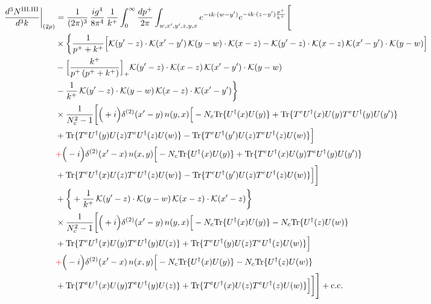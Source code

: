 \documentclass[9pt]{article}
\numberwithin{equation}{section}
\begin{document}
\begin{align}
\frac{d^{3}N^{\rm III.III}}{d^{3}k}\bigg|_{(2\rho)}&=\frac{1}{(2\pi)^{3}}\,\frac{ig^{4}}{8\pi^{4}}\,\frac{1}{k^{+}}\int_{0}^{\infty}\frac{dp^{+}}{2\pi}\int_{w,x',y',z,y,x}e^{-ik\cdot(w-y')}e^{-ik\cdot(z-y')\frac{p^{+}}{k^{+}}}\Bigg[\notag\\
&\times\bigg\{\frac{1}{p^{+}+k^{+}}\Big[\mathcal{K}(y'-z)\cdot\mathcal{K}(x'-y')\,\mathcal{K}(y-w)\cdot\mathcal{K}(x-z)-\mathcal{K}(y'-z)\cdot\mathcal{K}(x-z)\,\mathcal{K}(x'-y')\cdot\mathcal{K}(y-w)\Big]\notag\\
&-\Big[\frac{k^{+}}{p^{+}\,(p^{+}+k^{+})}\Big]_{+}\mathcal{K}(y'-z)\cdot\mathcal{K}(x-z)\,\mathcal{K}(x'-y')\cdot\mathcal{K}(y-w)\notag\\
&-\frac{1}{k^{+}}\,\mathcal{K}(y'-z)\cdot\mathcal{K}(y-w)\,\mathcal{K}(x-z)\cdot\mathcal{K}(x'-y')\bigg\}\notag\\
&\times \frac{1}{N_{c}^{2}-1}\bigg[\Big(+i\Big)\delta^{(2)}(x'-y)\,n(y,x)\Big[-N_{c}{\rm Tr}\{U^{\dagger}(x)U(y)\}+{\rm Tr}\{T^{e}U^{\dagger}(x)U(y)T^{e}U^{\dagger}(y)U(y')\}\notag\\
& +{\rm Tr}\{T^{e}U^{\dagger}(y)U(z)T^{e}U^{\dagger}(z)U(w)\}-{\rm Tr}\{T^{e}U^{\dagger}(y')U(z)T^{e}U^{\dagger}(z)U(w)\}\Big]\notag\\
& {\color{red}+}\Big(-i\Big)\delta^{(2)}(x'-x)\,n(x,y)\Big[-N_{c}{\rm Tr}\{U^{\dagger}(x)U(y)\}+{\rm Tr}\{T^{e}U^{\dagger}(x)U(y)T^{e}U^{\dagger}(y)U(y')\}\notag\\
& +{\rm Tr}\{T^{e}U^{\dagger}(x)U(z)T^{e}U^{\dagger}(z)U(w)\}-{\rm Tr}\{T^{e}U^{\dagger}(y')U(z)T^{e}U^{\dagger}(z)U(w)\}\Big]\bigg]\notag\\
&+\bigg\{+\frac{1}{k^{+}}\,\mathcal{K}(y'-z)\cdot\mathcal{K}(y-w)\,\mathcal{K}(x-z)\cdot\mathcal{K}(x'-z)\bigg\}\notag\\
&\times \frac{1}{N_{c}^{2}-1}\bigg[\Big(+i\Big)\delta^{(2)}(x'-y)\,n(y,x)\Big[-N_{c}{\rm Tr}\{U^{\dagger}(x)U(y)\}-N_{c}{\rm Tr}\{U^{\dagger}(z)U(w)\}\notag\\
& +{\rm Tr}\{T^{e}U^{\dagger}(x)U(y)T^{e}U^{\dagger}(y)U(z)\}+{\rm Tr}\{T^{e}U^{\dagger}(y)U(z)T^{e}U^{\dagger}(z)U(w)\}\Big]\notag\\
& {\color{red}+}\Big(-i\Big)\delta^{(2)}(x'-x)\,n(x,y)\Big[-N_{c}{\rm Tr}\{U^{\dagger}(x)U(y)\}-N_{c}{\rm Tr}\{U^{\dagger}(z)U(w)\}\notag\\
& +{\rm Tr}\{T^{e}U^{\dagger}(x)U(y)T^{e}U^{\dagger}(y)U(z)\}+{\rm Tr}\{T^{e}U^{\dagger}(x)U(z)T^{e}U^{\dagger}(z)U(w)\}\Big]\bigg]\Bigg]+{\rm c.c.}\label{eq:E-III.III-2}
\end{align}
\end{document}
